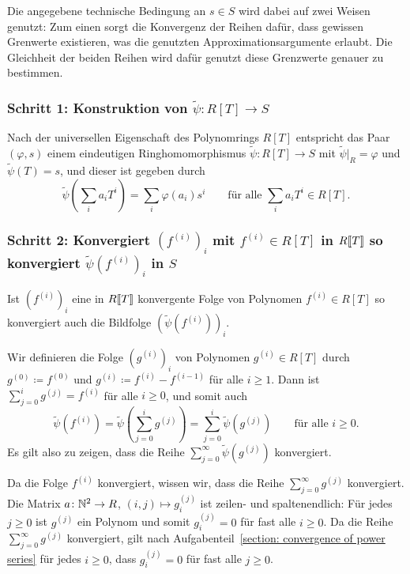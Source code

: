 \documentclass[a4paper, 10pt, numbers=noenddot]{scrartcl}
\begin{document}
Die angegebene technische Bedingung an $s \in S$ wird dabei auf zwei Weisen genutzt:
Zum einen sorgt die Konvergenz der Reihen dafür, dass gewissen Grenwerte existieren, was die genutzten Approximationsargumente erlaubt.
Die Gleichheit der beiden Reihen wird dafür genutzt diese Grenzwerte genauer zu bestimmen.


\subsubsection*{Schritt 1: Konstruktion von $\tilde{\psi} \colon R[T] \to S$}
Nach der universellen Eigenschaft des Polynomrings $R[T]$ entspricht das Paar $(\varphi, s)$ einem eindeutigen Ringhomomorphismus $\tilde{\psi} \colon R[T] \to S$ mit $\tilde{\psi}|_R = \varphi$ und $\tilde{\psi}(T) = s$, und dieser ist gegeben durch
\[
    \tilde{\psi}\left( \sum_i a_i T^i \right)
  = \sum_i \varphi(a_i) s^i
  \qquad
  \text{für alle $\sum_i a_i T^i \in R[T]$}.
\]


\subsubsection*{Schritt 2: Konvergiert $(f^{(i)})_i$ mit $f^{(i)} \in R[T]$ in $R[\![T]\!]$ so konvergiert $\tilde{\psi}(f^{(i)})_i$ in $S$}
Ist $(f^{(i)})_i$ eine in $R[\![T]\!]$ konvergente Folge von Polynomen $f^{(i)} \in R[T]$ so konvergiert auch die Bildfolge $( \tilde{\psi}(f^{(i)}) )_i$.

Wir definieren die Folge $( g^{(i)} )_i$ von Polynomen $g^{(i)} \in R[T]$ durch $g^{(0)} \coloneqq f^{(0)}$ und $g^{(i)} \coloneqq f^{(i)} - f^{(i-1)}$ für alle $i \geq 1$.
Dann ist $\sum_{j=0}^i g^{(j)} = f^{(i)}$ für alle $i \geq 0$, und somit auch
\[
    \tilde{\psi}\left( f^{(i)} \right)
  = \tilde{\psi}\left( \sum_{j=0}^i g^{(j)} \right)
  = \sum_{j=0}^i \tilde{\psi}\left( g^{(j)} \right)
  \qquad
  \text{für alle $i \geq 0$}.
\]
Es gilt also zu zeigen, dass die Reihe $\sum_{j=0}^\infty \tilde{\psi}(g^{(j)})$ konvergiert.

Da die Folge $f^{(i)}$ konvergiert, wissen wir, dass die Reihe $\sum_{j=0}^\infty g^{(j)}$ konvergiert.
Die Matrix $a \colon \mathbb{N}^2 \to R$, $(i,j) \mapsto g^{(j)}_i$ ist zeilen- und spaltenendlich:
Für jedes $j \geq 0$ ist $g^{(j)}$ ein Polynom und somit $g^{(j)}_i = 0$ für fast alle $i \geq 0$.
Da die Reihe $\sum_{j=0}^\infty g^{(j)}$ konvergiert, gilt nach Aufgabenteil~\ref{section: convergence of power series} für jedes $i \geq 0$, dass $g^{(j)}_i = 0$ für fast alle $j \geq 0$.
\end{document}
